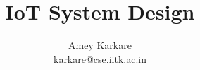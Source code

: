 \author[karkare]{Amey Karkare \\ \url{karkare@cse.iitk.ac.in}}
\date[IoT]{ }
\title[CS664]{IoT System Design}

